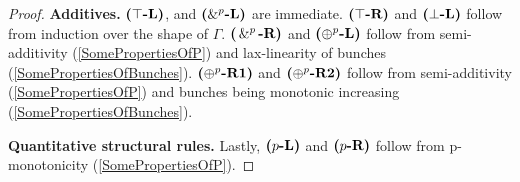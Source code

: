 \begin{proof}
    \textbf{Additives.} $\topL$, and $\sandL$ are immediate. $\topR$ and $\botL$ follow from induction over the shape of $\Gamma$. $\andR$ and $\orL$ follow from semi-additivity (\cref{SomePropertiesOfP}) and lax-linearity of bunches (\cref{SomePropertiesOfBunches}). $\sorRl$ and $\sorRr$ follow from semi-additivity (\cref{SomePropertiesOfP}) and bunches being monotonic increasing (\cref{SomePropertiesOfBunches}).

    \textbf{Quantitative structural rules.} Lastly, $\pL$ and $\pR$ follow from p-monotonicity (\cref{SomePropertiesOfP}). 

\end{proof}



